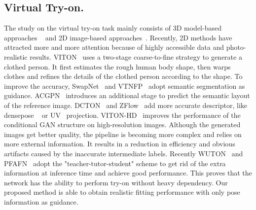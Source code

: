 \documentclass[runningheads]{llncs}
\begin{document}
\subsection{Virtual Try-on.}
The study on the virtual try-on task mainly consists of 3D model-based approaches ~\cite{bhatnagar2019multi,mir2020learning,bertiche2020cloth3d,lahner2018deepwrinkles} and 2D image-based approaches~\cite{han2018viton,CPVTON,li2021toward,yu2019vtnfp}. Recently, 2D methods have attracted more and more attention because of highly accessible data and photo-realistic results. VITON~\cite{han2018viton} uses a two-stage coarse-to-fine strategy to generate a clothed person. It first estimates the rough human body shape, then warps clothes and refines the details of the clothed person according to the shape. To improve the accuracy, SwapNet~\cite{raj2018swapnet} and VTNFP~\cite{yu2019vtnfp} adopt semantic segmentation as guidance. ACGPN~\cite{AGCPN} introduces an additional stage to predict the semantic layout of the reference image. DCTON~\cite{ge2021disentangled}  and ZFlow~\cite{zflow} add more accurate descriptor, like densepose ~\cite{guler2018densepose} or UV~\cite{feng2018joint} projection. VITON-HD~\cite{vitonhd} improves the performance of the conditional GAN structure on high-resolution images.  Although the generated images get better quality, the pipeline is becoming more complex and relies on more external information. It results in a reduction in efficiency and obvious artifacts caused by the inaccurate intermediate labels. Recently WUTON~\cite{issenhuth2020not} and PFAFN~\cite{ge2021parser} adopt the "teacher-tutor-student" scheme to get rid of the extra information at inference time and achieve good performance. This proves that the network has the ability to perform try-on without heavy dependency. Our proposed method is able to obtain realistic fitting performance with only pose information as guidance. 
\end{document}
